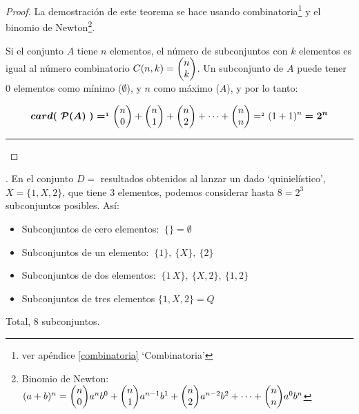 \begin{proof}
	\textcolor{gris}{La demostración de este teorema se hace usando combinatoria\footnote{ver apéndice \ref{combinatoria} `Combinatoria'}	y el binomio de Newton\footnote{\tiny{ Binomio de Newton:$(a+b)^n=\mqty(n\\0)a^nb^0+\mqty(n\\1)a^{n-1}b^1+\mqty(n\\2)a^{n-2}b^2+\cdots+\mqty(n\\n)a^0b^n$}}.}
	
	 \textcolor{gris}{Si el conjunto $A$ tiene $n$ elementos, el número de subconjuntos con $k$ elementos es igual al número combinatorio $C(n, k)= \mqty(n\\k) $. Un subconjunto de $A$ puede tener $0$ elementos como mínimo \textcolor{gris}{($\emptyset$)}, y $n$ como máximo \textcolor{gris}{($A$)}, y por lo tanto:}
	 
	 \textcolor{gris}{$$\boldsymbol{card(\ \mathcal P(A)\ )=^{_1}} \mqty(n\\0)+\mqty(n\\1)+\mqty(n\\2)+\cdots +\mqty(n\\n)=^{_2}(1+1)^n \boldsymbol{=2^n}$$ }
	 \rule{70mm}{0.1mm}
\end{proof}


\begin{example}
	. En el conjunto $D=$ resultados obtenidos al lanzar un dado `quinielístico', $X=\{1,X,2\}$, que tiene $3$ elementos, podemos considerar hasta $8=2^3$ subconjuntos posibles. Así:
	
	\begin{itemize}
	\vspace{-3mm}\item	Subconjuntos de cero elementos: $\ \{\}= \emptyset$
	\vspace{-3mm}\item	Subconjuntos de un elemento: $\ \{1\},\ \{X\}, \ \{2\}$ 
	\vspace{-3mm}\item	Subconjuntos de dos elementos: $\ \{1\,X\},\ \{X,2\}, \ \{1,2\} $
	\vspace{-3mm}\item 	Subconjuntos de tres elementos $\{1,X,2\}=Q$
	\end{itemize}
	
	Total, $8$ subconjuntos.
\end{example}


